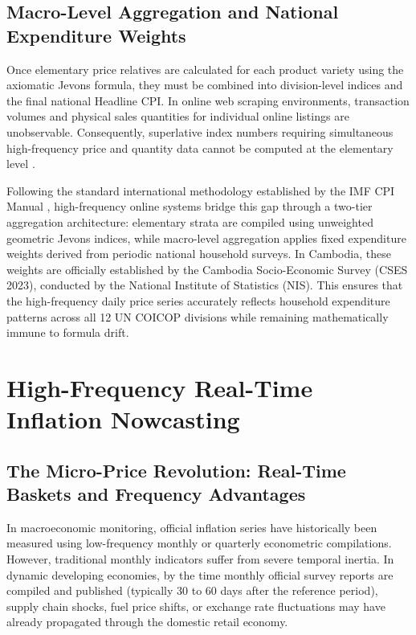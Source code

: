 \subsection{Macro-Level Aggregation and National Expenditure Weights}
\hs Once elementary price relatives are calculated for each product variety using the axiomatic Jevons formula, they must be combined into division-level indices and the final national Headline CPI. In online web scraping environments, transaction volumes and physical sales quantities for individual online listings are unobservable. Consequently, superlative index numbers requiring simultaneous high-frequency price and quantity data cannot be computed at the elementary level \citep{diewert2020substitution, chessa2016methodology}.

\hs Following the standard international methodology established by the IMF CPI Manual \citep{imf2020cpi}, high-frequency online systems bridge this gap through a two-tier aggregation architecture: elementary strata are compiled using unweighted geometric Jevons indices, while macro-level aggregation applies fixed expenditure weights derived from periodic national household surveys. In Cambodia, these weights are officially established by the Cambodia Socio-Economic Survey (CSES 2023), conducted by the National Institute of Statistics (NIS). This ensures that the high-frequency daily price series accurately reflects household expenditure patterns across all 12 UN COICOP divisions while remaining mathematically immune to formula drift.

\section{High-Frequency Real-Time Inflation Nowcasting}

\subsection{The Micro-Price Revolution: Real-Time Baskets and Frequency Advantages}
\hs In macroeconomic monitoring, official inflation series have historically been measured using low-frequency monthly or quarterly econometric compilations. However, traditional monthly indicators suffer from severe temporal inertia. In dynamic developing economies, by the time monthly official survey reports are compiled and published (typically 30 to 60 days after the reference period), supply chain shocks, fuel price shifts, or exchange rate fluctuations may have already propagated through the domestic retail economy.

